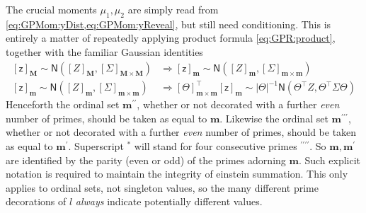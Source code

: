 \documentclass[preprint,12pt]{elsarticle}
\newcommand*{\M}[1]{\ensuremath{#1}\xspace}
\newcommand*{\x}{\times}
\newcommand*{\mi}[1]{\mathbf{#1}}
\newcommand*{\rv}[1]{\mathsf{#1}}
\newcommand*{\te}[2][]{\left\lbrack{#2}\right\rbrack_{#1}}
\newcommand*{\gauss}[2]{\mathsf{N}\!\left({#1,#2}\right)}
\newcommand*{\modulus}[1]{\M{\left\lvert{#1}\right\rvert}}
\begin{document}
    The crucial moments $\mu_{1},\mu_{2}$ are simply read from \cref{eq:GPMom:yDist,eq:GPMom:yReveal}, but still need conditioning. This is entirely a matter of repeatedly applying product formula \cref{eq:GPR:product}, together with the familiar Gaussian identities
    \begin{equation*}
        \begin{aligned}
            \te[\mi{M}]{\rv{z}} \sim \gauss{\te[\mi{M}]{Z}}{\te[\mi{M}\x\mi{M}]{\Sigma}} &\Rightarrow
            \te[\mi{m}]{\rv{z}} \sim \gauss{\te[\mi{m}]{Z}}{\te[\mi{m}\x\mi{m}]{\Sigma}} \\
            \te[\mi{m}]{\rv{z}} \sim \gauss{\te[\mi{m}]{Z}}{\te[\mi{m}\x\mi{m}]{\Sigma}} &\Rightarrow
            \te[\mi{m}\x\mi{m}]{\Theta}^{\intercal}\te[\mi{m}]{\rv{z}} \sim 
            \modulus{\Theta}^{-1}
            \gauss{\Theta^{\intercal}Z}{\Theta^{\intercal}\Sigma\Theta}                        
        \end{aligned}
    \end{equation*}
    Henceforth the ordinal set $\mi{m^{\prime\prime}}$, whether or not decorated with a further \emph{even} number of primes, should be taken as equal to $\mi{m}$. 
    Likewise the ordinal set $\mi{m^{\prime\prime\prime}}$, whether or not decorated with a further \emph{even} number of primes, should be taken as equal to $\mi{m^{\prime}}$. Superscript $^{*}$ will stand for four consecutive primes $^{\prime\prime\prime\prime}$. So $\mi{m}, \mi{m^{\prime}}$ are identified by the parity (even or odd) of the primes adorning $\mi{m}$. Such explicit notation is required to maintain the integrity of einstein summation. This only applies to ordinal sets, not singleton values, so the many different prime decorations of $l$ \emph{always} indicate potentially different values.
\end{document}
